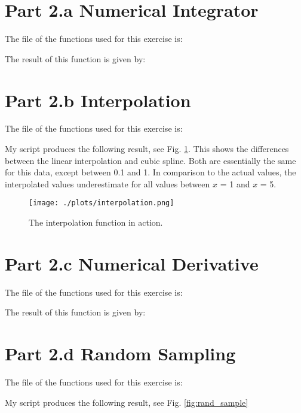 \section{Part 2.a Numerical Integrator}

The file of the functions used for this exercise is:



The result of this function is given by:



\section{Part 2.b Interpolation}

The file of the functions used for this exercise is:



My script produces the following result, see Fig. \ref{fig:interp}. This shows the differences between the linear
interpolation and cubic spline. Both are essentially the same for this data, except between 0.1 and 1. In comparison to
the actual values, the interpolated values underestimate for all values between $x$ = 1 and $x$ = 5.

\begin{figure}[h!]
  \centering
  \texttt{[image: ./plots/interpolation.png]}
  \caption{The interpolation function in action.}
  \label{fig:interp}
\end{figure}

\section{Part 2.c Numerical Derivative}

The file of the functions used for this exercise is:



The result of this function is given by:



\section{Part 2.d Random Sampling}

The file of the functions used for this exercise is:



My script produces the following result, see Fig. \ref{fig:rand_sample}

